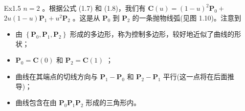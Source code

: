 \documentclass[../main.tex]{subfiles}
\begin{document}
\noindent\begin{minipage}{\linewidth}
Ex1.5 \(n = 2\) 。根据公式 (1.7) 和 (1.8)，我们有 \(\mathbf{C}\left( u\right)  = {\left( 1 - u\right) }^{2}{\mathbf{P}}_{0} +\)  \({2u}\left( {1 - u}\right) {\mathbf{P}}_{1} + {u}^{2}{\mathbf{P}}_{2}\) 。这是从 \({\mathbf{P}}_{0}\) 到 \({\mathbf{P}}_{2}\) 的一条抛物线弧(见图 1.10)。注意到

\begin{itemize}
\item 由 \(\left\{  {{\mathbf{P}}_{0},{\mathbf{P}}_{1},{\mathbf{P}}_{2}}\right\}\) 形成的多边形，称为控制多边形，较好地近似了曲线的形状；
\item \({\mathbf{P}}_{0} = \mathbf{C}\left( 0\right)\) 和 \({\mathbf{P}}_{2} = \mathbf{C}\left( 1\right)\) ；
\item 曲线在其端点的切线方向与 \({\mathbf{P}}_{1} - {\mathbf{P}}_{0}\) 和 \({\mathbf{P}}_{2} - {\mathbf{P}}_{1}\) 平行(这一点将在后面推导)；
\item 曲线包含在由 \({\mathbf{P}}_{0}{\mathbf{P}}_{1}{\mathbf{P}}_{2}\) 形成的三角形内。
\end{itemize}

\begin{center}
\begin{minipage}{6.5cm}
\centering
{}
\captionsetup{font=small,skip=6pt,justification=centering}
\end{minipage}
\end{center}
\end{minipage}
\par\medskip
\end{document}
